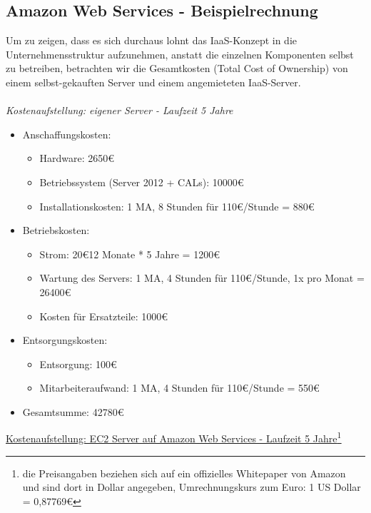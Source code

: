 \subsection{Amazon Web Services - Beispielrechnung}
Um zu zeigen, dass es sich durchaus lohnt das IaaS-Konzept in die
Unternehmensstruktur aufzunehmen, anstatt die einzelnen Komponenten selbst zu
betreiben, betrachten wir die Gesamtkosten (Total Cost of Ownership) von einem
selbst-gekauften Server und einem angemieteten IaaS-Server.
\\ \\
\emph{Kostenaufstellung: eigener Server - Laufzeit 5 Jahre}
\begin{itemize}
  \item Anschaffungskosten:
  	\begin{itemize}
  	  \item Hardware: 2650\euro
  	  \item Betriebssystem (Server 2012 + CALs): 10000\euro
  	  \item Installationskosten: 1 MA, 8 Stunden für 110\euro/Stunde = 880\euro
  	\end{itemize}
  \item Betriebskosten:
  	\begin{itemize}
  	  \item Strom: 20\euro * 12 Monate * 5 Jahre = 1200\euro
  	  \item Wartung des Servers: 1 MA, 4 Stunden für 110\euro/Stunde, 1x pro
  	  Monat = 26400\euro
  	  \item Kosten für Ersatzteile: 1000\euro
  	\end{itemize}
  \item Entsorgungskosten:
  	\begin{itemize}
  	  \item Entsorgung: 100\euro
  	  \item Mitarbeiteraufwand: 1 MA, 4 Stunden für 110\euro/Stunde = 550\euro
  	\end{itemize}
  \item Gesamtsumme: 42780\euro
\end{itemize}
\underline{Kostenaufstellung: EC2 Server auf Amazon Web Services - Laufzeit 5
Jahre\footnote{die Preisangaben beziehen sich auf ein offizielles Whitepaper
von Amazon und sind dort in Dollar angegeben, Umrechnungskurs zum Euro: 1 US
Dollar = 0,87769\euro}}
